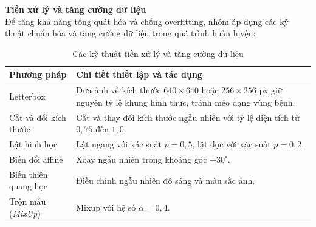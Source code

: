 \begin{frame}
    \textbf{Tiền xử lý và tăng cường dữ liệu}\\
    \footnotesize
    \justifying
    Để tăng khả năng tổng quát hóa và chống overfitting, nhóm áp dụng các kỹ thuật chuẩn hóa và tăng cường dữ liệu trong quá trình huấn luyện:

    \begin{table}[h]
        \centering
        \caption{Các kỹ thuật tiền xử lý và tăng cường dữ liệu}
        \label{tab:slide_data_aug}
        \scriptsize
        \setlength{\tabcolsep}{6pt}
        \begin{tabular}{lp{9.8cm}}
            \toprule
            Phương pháp               & Chi tiết thiết lập và tác dụng                                                                                              \\
            \midrule
            Letterbox                 & Đưa ảnh về kích thước $640 \times 640$ hoặc $256 \times 256$ px giữ nguyên tỷ lệ khung hình thực, tránh méo dạng vùng bệnh. \\
            Cắt và đổi kích thước     & Cắt và thay đổi kích thước ngẫu nhiên với tỷ lệ diện tích từ $0,75$ đến $1,0$.                                              \\
            Lật hình học              & Lật ngang với xác suất $p=0,5$, lật dọc với xác suất $p=0,2$.                                                               \\
            Biến đổi affine           & Xoay ngẫu nhiên trong khoảng góc $\pm 30^\circ$.                                                                            \\
            Biến thiên quang học      & Điều chỉnh ngẫu nhiên độ sáng và màu sắc ảnh.                                                                               \\
            Trộn mẫu (\textit{MixUp}) & Mixup với hệ số $\alpha=0,4$.                                                                                               \\
            \bottomrule
        \end{tabular}
    \end{table}
\end{frame}

